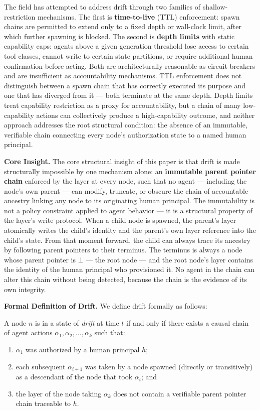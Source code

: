 The field has attempted to address drift through two families of shallow-restriction mechanisms. The first is \textbf{time-to-live} (TTL) enforcement: spawn chains are permitted to extend only to a fixed depth or wall-clock limit, after which further spawning is blocked. The second is \textbf{depth limits} with static capability caps: agents above a given generation threshold lose access to certain tool classes, cannot write to certain state partitions, or require additional human confirmation before acting. Both are architecturally reasonable as circuit breakers and are insufficient as accountability mechanisms. TTL enforcement does not distinguish between a spawn chain that has correctly executed its purpose and one that has diverged from it — both terminate at the same depth. Depth limits treat capability restriction as a proxy for accountability, but a chain of many low-capability actions can collectively produce a high-capability outcome, and neither approach addresses the root structural condition: the absence of an immutable, verifiable chain connecting every node's authorization state to a named human principal.

\textbf{Core Insight.} The core structural insight of this paper is that drift is made structurally impossible by one mechanism alone: an \textbf{immutable parent pointer chain} enforced by the \Fact{} layer at every node, such that no agent — including the node's own parent — can modify, truncate, or obscure the chain of accountable ancestry linking any node to its originating human principal. The immutability is not a policy constraint applied to agent behavior — it is a structural property of the \Fact{} layer's write protocol. When a child node is spawned, the parent's \Fact{} layer atomically writes the child's identity and the parent's own \Fact{} layer reference into the child's \Fact{} state. From that moment forward, the child can always trace its ancestry by following parent pointers to their terminus. The terminus is always a node whose parent pointer is $\bot$ — the root node — and the root node's \Fact{} layer contains the identity of the human principal who provisioned it. No agent in the chain can alter this chain without being detected, because the chain is the evidence of its own integrity.

\textbf{Formal Definition of Drift.} We define drift formally as follows:

\begin{invariant}\label{invariant:drift}
A \bxthree{} node $n$ is in a state of \emph{drift} at time $t$ if and only if there exists a causal chain of agent actions $\alpha_1, \alpha_2, \dots, \alpha_k$ such that:
\begin{enumerate}
  \item $\alpha_1$ was authorized by a human principal $h$;
  \item each subsequent $\alpha_{i+1}$ was taken by a node spawned (directly or transitively) as a descendant of the node that took $\alpha_i$; and
  \item the \Fact{} layer of the node taking $\alpha_k$ does not contain a verifiable parent pointer chain traceable to $h$.
\end{enumerate}
\end{invariant}

